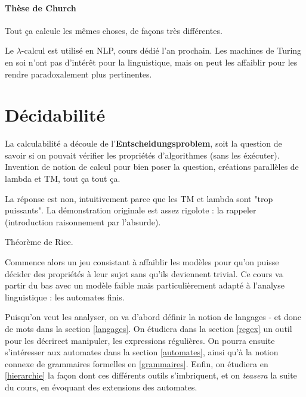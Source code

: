 \paragraph{Thèse de Church} Tout ça calcule les mêmes choses, de façons très différentes.

Le $\lambda$-calcul est utilisé en NLP, cours dédié l'an prochain. Les machines de Turing en soi n'ont pas d'intérêt pour la linguistique, mais on peut les affaiblir pour les rendre paradoxalement plus pertinentes.

\section{Décidabilité}

La calculabilité a découle de l'\textbf{Entscheidungsproblem}, soit la question de savoir si on pouvait vérifier les propriétés d'algorithmes (sans les éxécuter). Invention de notion de calcul pour bien poser la question, créations parallèles de lambda et TM, tout ça tout ça.

La réponse est non, intuitivement parce que les TM et lambda sont "trop puissants". La démonstration originale est assez rigolote : la rappeler (introduction raisonnement par l'absurde).

Théorème de Rice.

Commence alors un jeu consistant à affaiblir les modèles pour qu'on puisse décider des propriétés à leur sujet sans qu'ils deviennent trivial. Ce cours va partir du bas avec un modèle faible mais particulièrement adapté à l'analyse linguistique : les automates finis. %

Puisqu'on veut les analyser, on va d'abord définir la notion de langages - et donc de mots dans la section \ref{langages}. On étudiera dans la section \ref{regex} un outil pour les décrireet manipuler, les expressions régulières. On pourra ensuite s'intéresser aux automates dans la section \ref{automates}, ainsi qu'à la notion connexe de grammaires formelles en \ref{grammaires}. Enfin, on étudiera en \ref{hierarchie} la façon dont ces différents outils s'imbriquent, et on \textit{teasera} la suite du cours, en évoquant des extensions des automates.
